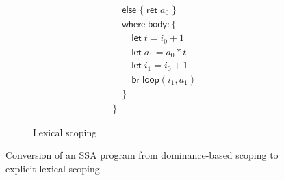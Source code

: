 \documentclass[acmsmall,screen,review]{acmart}
\newcommand{\ms}[1]{\ensuremath{\mathsf{#1}}}
\begin{document}
\begin{figure}
\begin{subfigure}[t]{.5\textwidth}
\begin{align*}
      & \quad \ms{else}\;\{\;\ms{ret}\;a_0\;\} \\
      & \quad \ms{where}\;\ms{body}: \{\\ 
      & \qquad \ms{let}\;t = i_0 + 1 \\
      & \qquad \ms{let}\;a_1 = a_0 * t \\
      & \qquad \ms{let}\;i_1 = i_0 + 1 \\
      & \qquad \ms{br}\;\ms{loop}(i_1, a_1) \\
      & \quad \} \\
      & \}
    \end{align*}
    \caption{Lexical scoping}
  \end{subfigure}
  \caption{Conversion of an SSA program from dominance-based scoping to explicit lexical scoping}
  \Description{}
  \label{fig:dominance-to-lexical}
\end{figure}
\end{document}
